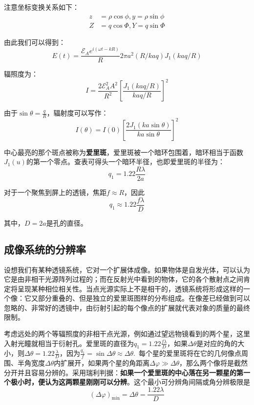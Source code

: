 \documentclass[UTF8]{ctexart}
\begin{document}
\noindent 注意坐标变换关系如下：
\begin{equation}
	\begin{aligned}
	z&=\rho \cos \phi, y=\rho \sin \phi\\
	Z&=q \cos \Phi, Y=q \sin \Phi
	\end{aligned}
\end{equation}

	由此我们可以得到：
	\begin{equation}
	E(t)=\frac{\mathscr{E}_{A} e^{i(\omega t-k R)}}{R} 2 \pi a^{2}(R / k a q) J_{1}(k a q / R)
	\end{equation}
	
\noindent 辐照度为：
\begin{equation}
I=\frac{2 \mathscr{E}_{A}^{2} A^{2}}{R^{2}}\left[\frac{J_{1}(k a q / R)}{k a q / R}\right]^{2}
\end{equation}

\noindent 由于$ \sin \theta= \frac{q}{R} $，辐射度可以写作：
\begin{equation}
I(\theta)=I(0)\left[\frac{2 J_{1}(k a \sin \theta)}{k a \sin \theta}\right]^{2}
\end{equation}

	中心最亮的那个斑点被称为\textbf{爱里斑}，爱里斑被一个暗环包围着，暗环相当于函数$ J_{1}(u) $的第一个零点。查表可得头一个暗环半径，也即爱里斑的半径为：
	\begin{equation}
		q_{1}=1.22 \frac{R \lambda}{2 a}
	\end{equation}
	
\noindent 对于一个聚焦到屏上的透镜，焦距$ f \approx R $，因此
\begin{equation}
	q_{1} \approx 1.22 \frac{f \lambda}{D}
\end{equation}

\noindent 其中，$ D=2a $是孔的直径。

\subsection{成像系统的分辨率}
	设想我们有某种透镜系统，它对一个扩展体成像。如果物体是自发光体，可以认为它是由非相干光源阵列过程的；而在反射光中看到的物体，它的各个散射点之间肯定将呈现某种相位相关性。当点光源实际上不是相干的，透镜系统将形成这样的一个像：它又部分重叠的、但是独立的爱里斑图样的分布组成。在像差已经做到可以忽略的、非常好的透镜中，由衍射引起的每个像点的扩展就代表对象的质量的最终限制。
	
	考虑远处的两个等辐照度的非相干点光源，例如通过望远物镜看到的两个星，这里入射光瞳就相当于衍射孔。爱里斑的直径为$ q_{1}= 1.22\frac{f \lambda}{D} $，如果$ \Delta \theta $是对应的角的大小，则$ \Delta \theta =1.22 \frac{\lambda}{D} $，因为$ \frac{q_{1}}{f}=\sin \Delta \theta \approx \Delta \theta $.\ 每个星的爱里斑将在它的几何像点周围、半角宽度$ \Delta \theta $内扩展开，如果两个星的角距离$ \Delta \varphi \gg \Delta \theta $，那么两个像将是截然分开并且容易分辨的。采用瑞利判据：\textbf{如果一个爱里斑的中心落在另一颗星的第一个极小时，便认为这两颗星刚刚可以分辨}。这个最小可分辨角间隔或角分辨极限是
	\begin{equation}
	(\Delta \varphi)_{\min }=\Delta \theta=\frac{1.22 \lambda}{D}
	\end{equation}
	
\end{document}
